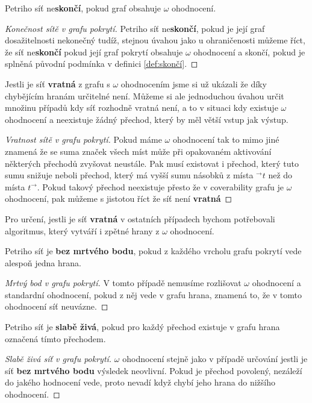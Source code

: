 \documentclass[
  biblatex,
  glossaries,
  printversion
]{kidiplom}
\begin{document}
Petriho síť ne\textbf{skončí}, pokud graf obsahuje $\omega$ ohodnocení.
\begin{proof}[Konečnost sítě v grafu pokrytí]
  Petriho síť ne\textbf{skončí}, pokud je její graf dosažitelnosti nekonečný tudíž,
  stejnou úvahou jako u ohraničenosti můžeme říct, že síť ne\textbf{skončí}
  pokud její graf pokrytí obsahuje $\omega$ ohodnocení a skončí, pokud je splněná
  původní podmínka v definici \ref{def:skončí}.
\end{proof}


Jestli je síť \textbf{vratná} z grafu s $\omega$ ohodnocením jsme si už ukázali 
že díky chybějícím hranám určitelné není. Můžeme si ale jednoduchou 
úvahou určit množinu případů kdy síť rozhodně vratná není, a to v 
situaci kdy existuje $\omega$ ohodnocení a neexistuje žádný přechod, 
který by měl větší vstup jak výstup.
\begin{proof}[Vratnost sítě v grafu pokrytí]
  Pokud máme $\omega$ ohodnocení tak to mimo jiné znamená že se suma značek všech 
  míst může při opakovaném aktivování
  některých přechodů zvyšovat neustále. Pak musí existovat i přechod,
  který tuto sumu snižuje neboli přechod, který má vyšší sumu
  násobků z místa $^\to t$ než do místa $t ^\to$. Pokud takový 
  přechod neexistuje přesto že v coverability grafu je $\omega$ ohodnocení,
  pak můžeme s jistotou říct že síť není \textbf{vratná}
\end{proof}
Pro určení, jestli je síť \textbf{vratná} v ostatních případech
bychom potřebovali algoritmus, který vytváří i zpětné hrany z $\omega$ ohodnocení.


Petriho síť je \textbf{bez mrtvého bodu}, pokud z každého vrcholu grafu 
pokrytí vede alespoň jedna hrana.
\begin{proof}[Mrtvý bod v grafu pokrytí]
  V tomto případě nemusíme rozlišovat $\omega$ ohodnocení a standardní ohodnocení,
  pokud z něj vede v grafu hrana, znamená to, že v tomto ohodnocení síť neuvázne.
\end{proof}

Petriho síť je \textbf{slabě živá}, pokud pro každý přechod existuje 
v grafu hrana označená tímto přechodem.
\begin{proof}[Slabě živá síť v grafu pokrytí]
  $\omega$ ohodnocení stejně jako v případě 
  určování jestli je síť \textbf{bez mrtvého bodu} 
  výsledek neovlivní. Pokud je přechod povolený, 
  nezáleží do jakého hodnocení vede, 
  proto nevadí když chybí jeho hrana do nižšího ohodnocení.
\end{proof}
\end{document}
